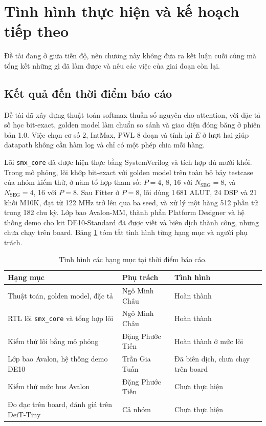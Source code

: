 \section{Tình hình thực hiện và kế hoạch tiếp theo}
\label{sec:plan}

Đề tài đang ở giữa tiến độ, nên chương này không đưa ra kết luận cuối cùng mà tổng kết những gì đã làm được và nêu các việc của giai đoạn còn lại.

\subsection{Kết quả đến thời điểm báo cáo}

Đề tài đã xây dựng thuật toán softmax thuần số nguyên cho attention, với đặc tả số học bit-exact, golden model làm chuẩn so sánh và giao diện đóng băng ở phiên bản 1.0. Việc chọn cơ số 2, IntMax, PWL 8 đoạn và tính lại $E$ ở lượt hai giúp datapath không cần hàm log và chỉ có một phép chia mỗi hàng.

Lõi \texttt{smx\_core} đã được hiện thực bằng SystemVerilog và tích hợp đủ mười khối. Trong mô phỏng, lõi khớp bit-exact với golden model trên toàn bộ bảy testcase của nhóm kiểm thử, ở năm tổ hợp tham số: $P = 4$, 8, 16 với $N_{\text{SEG}} = 8$, và $N_{\text{SEG}} = 4$, 16 với $P = 8$. Sau Fitter ở $P = 8$, lõi dùng 1\,681 ALUT, 24 DSP và 21 khối M10K, đạt từ 122 MHz trở lên qua ba seed, và xử lý một hàng 512 phần tử trong 182 chu kỳ. Lớp bao Avalon-MM, thành phần Platform Designer và hệ thống demo cho kit DE10-Standard đã được viết và biên dịch thành công, nhưng chưa chạy trên board. Bảng \ref{tab:status} tóm tắt tình hình từng hạng mục và người phụ trách.

\begin{table}[htbp]
\centering
\small
\begin{tabular}{p{6.4cm}ll}
\toprule
Hạng mục & Phụ trách & Tình hình \\
\midrule
Thuật toán, golden model, đặc tả & Ngô Minh Châu & Hoàn thành \\
RTL lõi \texttt{smx\_core} và tổng hợp lõi & Ngô Minh Châu & Hoàn thành \\
Kiểm thử lõi bằng mô phỏng & Đặng Phước Tiến & Hoàn thành ở mức lõi \\
Lớp bao Avalon, hệ thống demo DE10 & Trần Gia Tuấn & Đã biên dịch, chưa chạy trên board \\
Kiểm thử mức bus Avalon & Đặng Phước Tiến & Chưa thực hiện \\
Đo đạc trên board, đánh giá trên DeiT-Tiny & Cả nhóm & Chưa thực hiện \\
\bottomrule
\end{tabular}
\caption{Tình hình các hạng mục tại thời điểm báo cáo.}
\label{tab:status}
\end{table}

